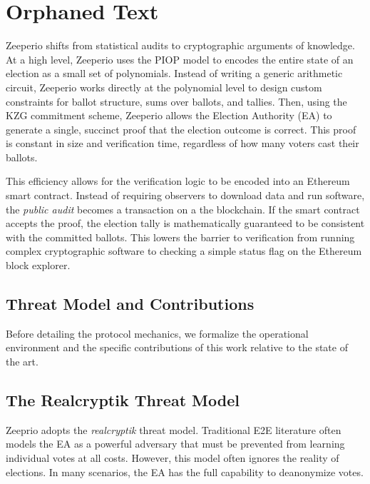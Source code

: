 
\clearpage

\section{Orphaned Text}

Zeeperio shifts from statistical audits to cryptographic arguments of knowledge. 
At a high level, Zeeperio uses the PIOP model to encodes the entire state of an election as a small set of polynomials. 
Instead of writing a generic arithmetic circuit, Zeeperio works directly at the polynomial level to design custom constraints for ballot structure, sums over ballots, and tallies.
Then, using the KZG commitment scheme, Zeeperio allows the Election Authority (EA) to generate a single, succinct proof that the election outcome is correct.
This proof is constant in size and verification time, regardless of how many voters cast their ballots.

This efficiency allows for the verification logic to be encoded into an
Ethereum smart contract. Instead of requiring observers to download data and
run software, the \emph{public audit} becomes a transaction on a the blockchain. 
If the smart contract accepts the proof, the election tally is mathematically guaranteed to be consistent with the committed ballots. 
This lowers the barrier to verification from running complex cryptographic software to checking a simple status flag on the Ethereum block explorer.

\subsection{Threat Model and Contributions}

Before detailing the protocol mechanics, we formalize the operational environment and the specific contributions of this work relative to the state of the art.

\subsection{The Realcryptik Threat Model}
Zeeprio adopts the \textit{realcryptik} threat model. 
Traditional E2E literature often models the EA as a powerful adversary that must be prevented from learning individual votes at all costs. 
However, this model often ignores the reality of elections. In many scenarios, the EA has the full capability to deanonymize votes.

